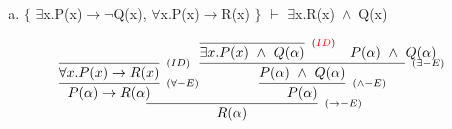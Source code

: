 \documentclass[aspectratio=43]{beamer}
\newcommand{\ria}{$\rightarrow$}
\newcommand{\fall}{$\forall$}
\newcommand{\ex}{$\exists$}
\newcommand{\nao}{$\neg$}
\newcommand{\andd}{$\wedge$}
\begin{document}
    \begin{frame}[fragile]
    
    	\begin{enumerate}[d)]
			\item $\{$ \ex x.P(x)\ria \nao Q(x), \fall x.P(x)\ria R(x) $\}$ $\vdash$ \ex x.R(x)\ \andd\ Q(x) \\
		\end{enumerate}
        
        \vspace{65pt}
        
        \[
        \begin{array}{c}
		
        	\infer[_{(\to -E)}]
            	{R(\alpha)}
            	{\infer[_{(\forall -E)}]
                	{P(\alpha) \rightarrow R(\alpha)} 
                    {\infer[_{(ID)}]
                    	{\forall x.P(x)\to R(x)}
                    	{}
                    }  
            	\infer[_{(\land -E)}] 
                	{P(\alpha)}
                    {\infer[_{(\exists -E)}]
                    	{P(\alpha)\ \land \ Q(\alpha)}
                    	{\infer[_{(\textcolor{red}{ID})}]
                        	{\exists x.P(x)\ \land \ Q(\alpha)}
                            {}
                        \hspace{10pt}
                        P(\alpha)\ \land \ Q(\alpha)
                        }
                    }
                }
		\end{array}
        \]
        
	\end{frame}
    
\end{document}

